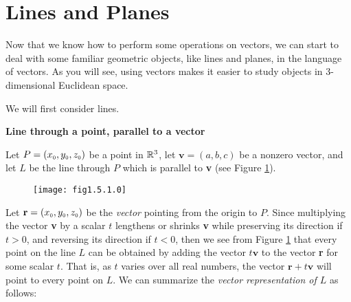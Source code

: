 \newpage
\section{Lines and Planes}
Now that we know how to perform some operations on vectors, we can start to deal with some familiar geometric objects,
like lines and planes, in the language of vectors. 
As you will see, using vectors makes it easier
to study objects in 3-dimensional Euclidean space. 

We will first consider lines.\medskip

\par\noindent\textbf{\large{Line through a point, parallel to a vector}}\normalsize\smallskip

Let $P = (x_{\scriptscriptstyle 0},y_{\scriptscriptstyle 0},z_{\scriptscriptstyle 0})$ be a point in $\mathbb{R}^{3}$, let $\textbf{v} = (a,b,c)$ be a nonzero
vector, and let $L$ be the line through $P$ which is parallel to \textbf{v} (see Figure \ref{fig:linepvec}).

\begin{figure}[h]
 \begin{center}
  \texttt{[image: fig1.5.1.0]}
 \end{center}
 \caption[]{}
 \label{fig:linepvec}
\end{figure}

Let $\textbf{r} = (x_{\scriptscriptstyle 0},y_{\scriptscriptstyle 0},z_{\scriptscriptstyle 0})$ be the \emph{vector} pointing from the origin to $P$. Since
multiplying the vector \textbf{v} by a scalar $t$ lengthens or shrinks \textbf{v} while preserving its direction
if $t > 0$, and reversing its direction if $t < 0$, then we see from Figure \ref{fig:linepvec} that every point on the
line $L$ can be obtained by adding the vector $t \textbf{v}$ to the vector \textbf{r} for some scalar $t$. That is, as
$t$ varies over all real numbers, the vector $\textbf{r} + t \textbf{v}$ will point to every point on $L$. We can
summarize the \emph{vector representation of $L$} as follows:\smallskip
{}

